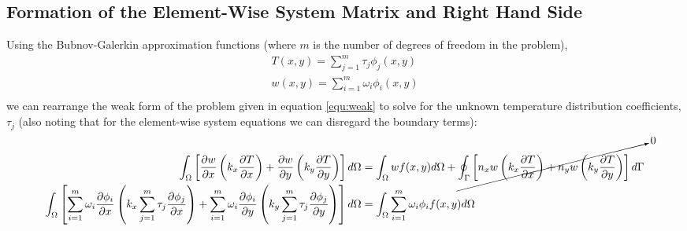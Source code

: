 \documentclass[letterpaper,10pt]{article}
\begin{document}
\subsection{Formation of the Element-Wise System Matrix and Right Hand Side}
Using the Bubnov-Galerkin approximation functions (where $m$ is the number of degrees of freedom in the problem),
\begin{equation}
\label{equ:bubnov-galerkin}
\begin{array}{l}
T(x,y) = \displaystyle\sum\limits_{j=1}^m \tau_j \phi_j(x,y) \\
w(x,y) = \displaystyle\sum\limits_{i=1}^m \omega_i \phi_i(x,y) \\
\end{array}
\end{equation}
\noindent we can rearrange the weak form of the problem given in equation \ref{equ:weak} to solve for the unknown temperature distribution coefficients, $\tau_j$ (also noting that for the element-wise system equations we can disregard the boundary terms):
\[\begin{split}
\int_\Omega \left[\frac{\partial w}{\partial x}\left(k_x\frac{\partial T}{\partial x}\right) + \frac{\partial w}{\partial y}\left(k_y\frac{\partial T}{\partial y}\right) \right]d\Omega &= \int_\Omega wf(x,y)d\Omega + \cancelto{0}{\oint_\Gamma \left[n_xw\left(k_x\frac{\partial T}{\partial x}\right) + n_yw\left(k_y\frac{\partial T}{\partial y}\right)\right]d\Gamma} \\
\int_\Omega \left[\displaystyle\sum\limits_{i=1}^m \omega_i\frac{\partial \phi_i}{\partial x}\left(k_x\displaystyle\sum\limits_{j=1}^m\tau_j\frac{\partial \phi_j}{\partial x}\right) + \displaystyle\sum\limits_{i=1}^m \omega_i\frac{\partial \phi_i}{\partial y}\left(k_y\displaystyle\sum\limits_{j=1}^m\tau_j\frac{\partial \phi_j}{\partial y}\right) \right]d\Omega &= \int_\Omega \displaystyle\sum\limits_{i=1}^m \omega_i\phi_if(x,y)d\Omega
\end{split}\]
\end{document}
